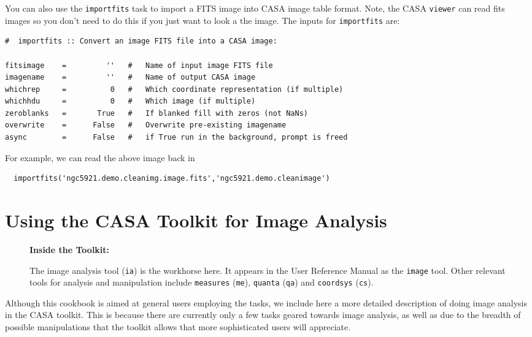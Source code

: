 You can also use the {\tt importfits} task to import a FITS image into
CASA image table format.  Note, the CASA {\tt viewer} can read fits
images so you don't need to do this if you just want to look a the image.  
The inputs for {\tt importfits} are:
\small
\begin{verbatim}
#  importfits :: Convert an image FITS file into a CASA image:

fitsimage    =         ''   #   Name of input image FITS file
imagename    =         ''   #   Name of output CASA image
whichrep     =          0   #   Which coordinate representation (if multiple)
whichhdu     =          0   #   Which image (if multiple)
zeroblanks   =       True   #   If blanked fill with zeros (not NaNs)
overwrite    =      False   #   Overwrite pre-existing imagename
async        =      False   #   if True run in the background, prompt is freed
\end{verbatim}
\normalsize
For example, we can read the above image back in
\small
\begin{verbatim}
  importfits('ngc5921.demo.cleanimg.image.fits','ngc5921.demo.cleanimage')
\end{verbatim}
\normalsize

\section{Using the CASA Toolkit for Image Analysis}
\label{section:analysis.toolkit}

\begin{wrapfigure}{r}{2.5in}
  \begin{boxedminipage}{2.5in}
     \centerline{\bf Inside the Toolkit:}
     The image analysis tool ({\tt ia}) is the workhorse here.
     It appears in the User Reference Manual as the {\tt image}
     tool.  Other relevant tools for analysis and manipulation
     include {\tt measures} ({\tt me}), {\tt quanta} ({\tt qa})
     and {\tt coordsys} ({\tt cs}).
  \end{boxedminipage}
\end{wrapfigure}

Although this cookbook is aimed at general users employing the
tasks, we include here a more detailed description of doing
image analysis in the CASA toolkit.  This is because
there are currently only a few tasks geared towards image analysis,
as well as due to the breadth of possible manipulations that the
toolkit allows that more sophisticated users will appreciate.

